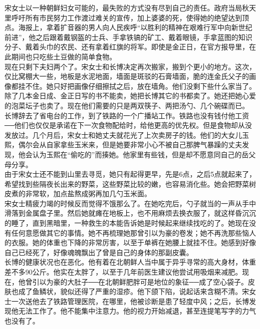 \begin{multicols}{\theparacolNo}
宋女士以一种朝鲜妇女可能的，最失败的方式没有尽到自己的责任。政府当局秋天里呼吁所有市民努力工作渡过难关的宣传，加上婆婆的死，使得她的绝望达到顶点。海报上，拿着扩音器的男人向人民疾呼“以胜利的精神在艰难行军中向新世纪前进”，他之后跟着戴钢盔的士兵、手拿铁镐的矿工、戴着眼镜，手拿蓝图的知识分子、戴着头巾的农民、还有拿着红旗的将军。即使是金正日，在官方报导里，在此期间也只吃些土豆做的简单食物。\\

现在只剩下夫妇两个了。宋女士和长博决定再次搬家，搬到个更小的地方。这次，仅比窝棚大一些，地板是水泥地面，墙面是斑驳的石膏墙面，脆的连金氏父子的画像都挂不住。她只好把画像仔细擦拭之后，放在墙角。他们没剩下些什么家当了。除了几本金日成、金正日写的书不能卖，她把长博其它的书都卖了。她还把她心爱的泡菜坛子也卖了。现在他们需要的只是两双筷子、两把汤勺、几个碗碟而已。\\

长博辞去了省电台的工作，到了铁路的一个广播站工作。铁路也没有钱付他工资──他们也仅仅是承诺在下一次食物配给时，给他更高的优先权。但是食物却从没发放过。几个月后，宋女士和她丈夫就花光了上次卖房子的钱。他们的大女儿玉熙，偶尔会从自家拿些玉米来，但是她要非常小心不被自己那脾气暴躁的丈夫发现，他会认为玉熙在“偷吃的”而揍她。他家里有些钱，但是却不愿意同自己的岳父母分享。\\

由于宋女士还不能到山里去寻觅，她只有起得更早，先是6点，之后5点就起来了，希望找到些隔夜长出来的野菜，这些野菜比较的嫩，也容易消化些。她会把野菜树皮煮的非常软，加点盐熬成粥再加几勺玉米面。\\

宋女士精疲力竭的时候反而觉得不饿那么了。在她吃完后，勺子就当的一声从手中滑落到金属盘子里。然后她就瘫在地板上，也不用麻烦去换衣服了，就这样昏沉沉的睡了，直到黑暗里，一种救生的本能告诉她是时候起来继续找吃的了。她现在没有任何意愿做其它的事情。她不再梳理她那曾引以为豪的卷发；她不再洗那些恼人的衣服。她的体重也下降的非常厉害，以至于单裤在她腰上就挂不住。她感到好像自己已经死了，好像魂魄飘出了曾是自己的身体的那副皮囊。\\

长博的健康状况也在恶化。他有着在北朝鲜人当中属于异乎寻常的高大身材，体重差不多90公斤。他实在太胖了，以至于几年前医生建议他尝试用吸烟来减肥。现在，他曾引以为豪的大肚子──在北朝鲜肥胖可是地位的象征──成了空心袋子。皮肤也成了鱼鳞状，貌似还得了严重的湿疹。他下颌下陷，说起话来含糊不清。宋女士一次送他去了铁路管理医院，在哪里，他被诊断是患了轻度中风；之后，长博发现他无法工作了。他不能集中注意力。他的视力开始减退，甚至连提笔写字的力气也没有了。\\


\end{multicols}
